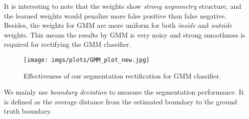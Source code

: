 \documentclass[10pt,journal,compsoc]{newIEEEtran}
\begin{document}
It is interesting to note that the weights show \emph{strong asymmetry} structure, and the learned weights would penalize more false positive than false negative. Besides, the weights for GMM are more uniform for both \emph{inside} and \emph{outside} weights. This means the results by GMM is very noisy and strong smoothness is required for rectifying the GMM classifier.
\begin{figure}[t]
  \centering
  \texttt{[image: imgs/plots/GMM\_plot\_new.jpg]}\\
  \caption{Effectiveness of our segmentation rectification for GMM classifier.}\label{FIG:RstRectfyGMM}
  \vspace{-0.5cm}
  \end{figure} We mainly use \emph{boundary deviation} to measure the segmentation performance. It is defined as the average distance from the estimated boundary to the ground truth boundary. %
\end{document}
